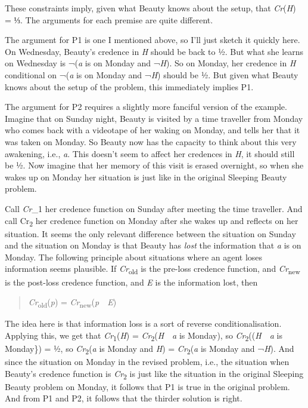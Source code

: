 \documentclass[
  11pt,
  letterpaper,
  DIV=11,
  numbers=noendperiod,
  twoside]{scrartcl}
\begin{document}
These constraints imply, given what Beauty knows about the setup, that
\emph{Cr}(\emph{H}) = ⅓. The arguments for each premise are quite
different.

The argument for P1 is one I mentioned above, so I'll just sketch it
quickly here. On Wednesday, Beauty's credence in \emph{H} should be back
to ½. But what she learns on Wednesday is ¬(\emph{a} is on Monday and
¬\emph{H}). So on Monday, her credence in \emph{H} conditional on
¬(\emph{a} is on Monday and ¬\emph{H}) should be ½. But given what
Beauty knows about the setup of the problem, this immediately implies
P1.

The argument for P2 requires a slightly more fanciful version of the
example. Imagine that on Sunday night, Beauty is visited by a time
traveller from Monday who comes back with a videotape of her waking on
Monday, and tells her that it was taken on Monday. So Beauty now has the
capacity to think about this very awakening, i.e., \emph{a}. This
doesn't seem to affect her credences in \emph{H}, it should still be ½.
Now imagine that her memory of this visit is erased overnight, so when
she wakes up on Monday her situation is just like in the original
Sleeping Beauty problem.

Call \emph{Cr}\_1 her credence function on Sunday after meeting the time
traveller. And call Cr\textsubscript{2} her credence function on Monday
after she wakes up and reflects on her situation. It seems the only
relevant difference between the situation on Sunday and the situation on
Monday is that Beauty has \emph{lost} the information that \emph{a} is
on Monday. The following principle about situations where an agent loses
information seems plausible. If \emph{Cr}\textsubscript{old} is the
pre-loss credence function, and \emph{Cr}\textsubscript{new} is the
post-loss credence function, and \emph{E} is the information lost, then

\begin{quote}
\emph{Cr}\textsubscript{old}(\emph{p}) =
\emph{Cr}\textsubscript{new}(\emph{p}~\textbar~\emph{E})
\end{quote}

The idea here is that information loss is a sort of reverse
conditionalisation. Applying this, we get that
\emph{Cr}\textsubscript{1}(\emph{H}) =
\emph{Cr}\textsubscript{2}(\emph{H}~\textbar~\emph{a} is Monday), so
\emph{Cr}\textsubscript{2}((\emph{H}~\textbar~\emph{a} is Monday\}) = ½,
so \emph{Cr}\textsubscript{2}(\emph{a} is Monday and \emph{H}) =
\emph{Cr}\textsubscript{2}(\emph{a} is Monday and ¬\emph{H}). And since
the situation on Monday in the revised problem, i.e., the situation when
Beauty's credence function is \emph{Cr}\textsubscript{2} is just like
the situation in the original Sleeping Beauty problem on Monday, it
follows that P1 is true in the original problem. And from P1 and P2, it
follows that the thirder solution is right.
\end{document}
